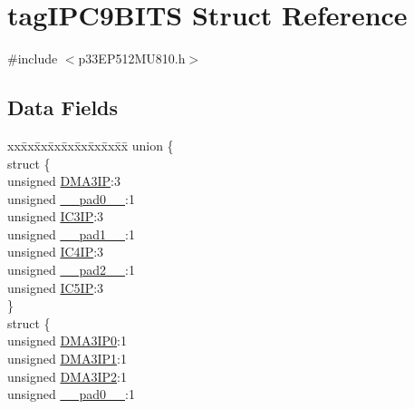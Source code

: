 \hypertarget{structtag_i_p_c9_b_i_t_s}{}\section{tag\+I\+P\+C9\+B\+I\+TS Struct Reference}
\label{structtag_i_p_c9_b_i_t_s}


{\ttfamily \#include $<$p33\+E\+P512\+M\+U810.\+h$>$}

\subsection*{Data Fields}
\begin{DoxyCompactItemize}
\item 
\begin{tabbing}
xx\=xx\=xx\=xx\=xx\=xx\=xx\=xx\=xx\=\kill
union \{\\
\>struct \{\\
\>\>unsigned \hyperlink{structtag_i_p_c9_b_i_t_s_adb74d37979853fdad87b9a3d8a0f275f}{DMA3IP}:3\\
\>\>unsigned \hyperlink{structtag_i_p_c9_b_i_t_s_adf71f3d8410c1f1dbbc96680a92c49af}{\_\_pad0\_\_}:1\\
\>\>unsigned \hyperlink{structtag_i_p_c9_b_i_t_s_ab78f8edf1cd8b478fd805c5da97a48e5}{IC3IP}:3\\
\>\>unsigned \hyperlink{structtag_i_p_c9_b_i_t_s_acaf2d0924a107ec6e8d2e31febaf66f9}{\_\_pad1\_\_}:1\\
\>\>unsigned \hyperlink{structtag_i_p_c9_b_i_t_s_ade27f706c243634654fa8587d41a3738}{IC4IP}:3\\
\>\>unsigned \hyperlink{structtag_i_p_c9_b_i_t_s_a4d97cc5f7d51d22fc2bf3eab35c9cb7f}{\_\_pad2\_\_}:1\\
\>\>unsigned \hyperlink{structtag_i_p_c9_b_i_t_s_ac6ec533d3b481f92c5be3c16a13c6bb6}{IC5IP}:3\\
\>\} \\
\>struct \{\\
\>\>unsigned \hyperlink{structtag_i_p_c9_b_i_t_s_a7869fcf06572f59a6bf4964f1608aaf6}{DMA3IP0}:1\\
\>\>unsigned \hyperlink{structtag_i_p_c9_b_i_t_s_a79abff831d29c41969364e9d3fb9cb9e}{DMA3IP1}:1\\
\>\>unsigned \hyperlink{structtag_i_p_c9_b_i_t_s_a80877f000c3a6a90aed620e90e2e8a27}{DMA3IP2}:1\\
\>\>unsigned \hyperlink{structtag_i_p_c9_b_i_t_s_adf71f3d8410c1f1dbbc96680a92c49af}{\_\_pad0\_\_}:1\\

\end{tabbing}
\end{DoxyCompactItemize}
